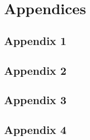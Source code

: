 \documentclass[11pt,a4paper,landscape]{article}
\begin{document}
\section{Appendices}
\subsection{Appendix 1}


\subsection{Appendix 2}


\subsection{Appendix 3}


\subsection{Appendix 4}

\end{document}
